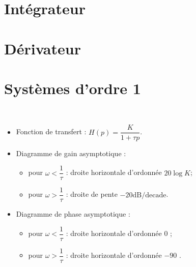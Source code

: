 \documentclass[10pt,fleqn]{article} %
\begin{document}
\section{Intégrateur}
\section{Dérivateur}
\section{Systèmes d'ordre 1}
\begin{resultat} ~\\

\noindent\begin{minipage}[c]{.53\linewidth}
\begin{itemize}
\item Fonction de transfert : $H(p)=\dfrac{K}{1+\tau p}$.
\item Diagramme de gain asymptotique : 
\begin{itemize}
\item pour $\omega<\dfrac{1}{\tau}$ : droite horizontale d'ordonnée $20 \log K$;
\item pour $\omega>\dfrac{1}{\tau}$ : droite de pente $-{20}\text{dB/decade}$.
\end{itemize}
\item Diagramme de phase asymptotique : 
\begin{itemize}
\item pour $\omega<\dfrac{1}{\tau}$ : droite horizontale d'ordonnée 0 \degre;
\item pour $\omega>\dfrac{1}{\tau}$ : droite horizontale d'ordonnée $-90$ \degre.
\end{itemize}
\end{itemize}
\end{minipage} \hfill
\begin{minipage}[c]{.45\linewidth}

\end{minipage}
\end{resultat}
\end{document}
